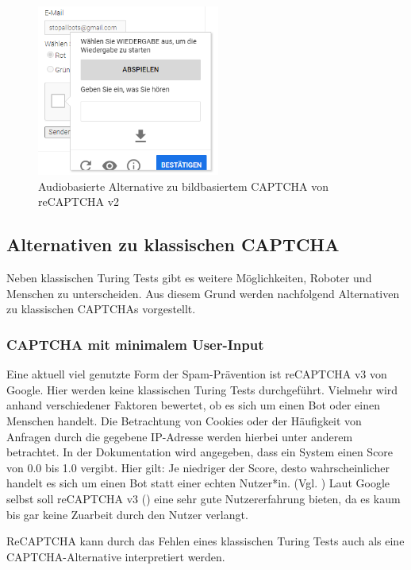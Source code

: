 \begin{figure}[h!]
    \centering
    \includegraphics[width=6cm]{gfx/mygraphics/audio.png}
     \caption{Audiobasierte Alternative zu bildbasiertem CAPTCHA von reCAPTCHA v2}
      \label{fig:audio}
\end{figure}

\pagebreak

\subsection{Alternativen zu klassischen CAPTCHA}
\label{ch:basics:captcha:alternativen}
Neben klassischen Turing Tests gibt es weitere Möglichkeiten, Roboter und Menschen zu unterscheiden.
Aus diesem Grund werden nachfolgend Alternativen zu klassischen CAPTCHAs vorgestellt.

\subsubsection*{CAPTCHA mit minimalem User-Input}
Eine aktuell viel genutzte Form der Spam-Prävention ist reCAPTCHA v3 von Google. 
Hier werden keine klassischen Turing Tests durchgeführt. 
Vielmehr wird anhand verschiedener Faktoren bewertet, ob es sich um einen Bot oder einen Menschen handelt.
Die Betrachtung von Cookies oder der Häufigkeit von Anfragen durch die gegebene IP-Adresse werden hierbei unter anderem betrachtet.
In der Dokumentation wird angegeben, dass ein System einen Score von 0.0 bis 1.0 vergibt. 
Hier gilt: Je niedriger der Score, desto wahrscheinlicher handelt es sich um einen Bot statt einer echten Nutzer*in. (Vgl. \cite{recaptchadoc})
Laut Google selbst soll reCAPTCHA v3 (\cite{googleblog:recaptcha}) eine sehr gute Nutzererfahrung bieten, da es kaum bis gar keine Zuarbeit durch den Nutzer verlangt. 

ReCAPTCHA kann durch das Fehlen eines klassischen Turing Tests auch als eine CAPTCHA-Alternative interpretiert werden.


